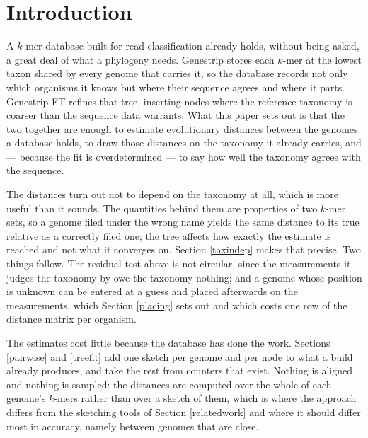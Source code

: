 \documentclass[pdflatex,sn-vancouver-num]{sn-jnl}
\begin{document}

    \maketitle

\section{Introduction}\label{introduction}

A $k$-mer database built for read classification already holds, without being asked, a great deal of
what a phylogeny needs. Genestrip \cite{genestrip-pub} stores each $k$-mer at the lowest taxon shared
by every genome that carries it, so the database records not only which organisms it knows but where
their sequence agrees and where it parts. Genestrip-FT \cite{genestrip-ft} refines that tree,
inserting nodes where the reference taxonomy is coarser than the sequence data warrants. What this
paper sets out is that the two together are enough to estimate evolutionary distances between the
genomes a database holds, to draw those distances on the taxonomy it already carries, and --- because
the fit is overdetermined --- to say how well the taxonomy agrees with the sequence.

The distances turn out not to depend on the taxonomy at all, which is more useful than it sounds.
The quantities behind them are properties of two $k$-mer sets, so a genome filed under the wrong name
yields the same distance to its true relative as a correctly filed one; the tree affects how exactly
the estimate is reached and not what it converges on. Section \ref{taxindep} makes that precise. Two
things follow. The residual test above is not circular, since the measurements it judges the taxonomy
by owe the taxonomy nothing; and a genome whose position is unknown can be entered at a guess and
placed afterwards on the measurements, which Section \ref{placing} sets out and which costs one row
of the distance matrix per organism.

The estimates cost little because the database has done the work. Sections \ref{pairwise}
and \ref{treefit} add one sketch per genome and per node to what a build already produces, and take
the rest from counters that exist. Nothing is aligned and nothing is sampled: the distances are
computed over the whole of each genome's $k$-mers rather than over a sketch of them, which is where
the approach differs from the sketching tools of Section \ref{relatedwork} and where it should
differ most in accuracy, namely between genomes that are close.
\end{document}
